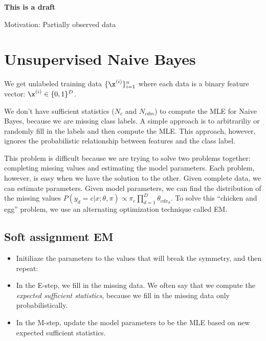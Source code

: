 \documentclass{discussion}
\begin{document}

{\Huge \bf This is a draft}


Motivation: Partially observed data

\section{Unsupervised Naive Bayes}
We get unlabeled training data $\{\x^{(i)}\}_{i=1}^{n}$ where each data is a binary feature vector: $\x^{(i)} \in \{0,1\}^D$.

We don't have sufficient statistics ($N_c$ and $N_{cdm}$) to compute the MLE for Naive Bayes, because we are missing class labels. A simple approach is to arbitrariliy or randomly fill in the labels and then compute the MLE. This approach, however, ignores the probabilistic relationship between features and the class label.

This problem is difficult because we are trying to solve two problems together: completing missing values and estimating the model parameters. Each problem, however, is easy when we have the solution to the other. Given complete data, we can estimate parameters. Given model parameters, we can find the distribution of the missing values $P(y_d = c | x; \theta, \pi) \propto \pi_{c} \prod_{d=1}^{D} \theta_{c d x_d}$. To solve this ``chicken and egg'' problem, we use an alternating optimization technique called EM.

\subsection{Soft assignment EM}

\begin{itemize}
    \item Initiliaze the parameters to the values that will break the symmetry, and then repeat:
    \item In the E-step, we fill in the missing data. We often say that we compute the \emph{expected sufficient statistics}, because we fill in the missing data only probabilistically.
    \item In the M-step, update the model parameters to be the MLE based on new expected sufficient statistics.
\end{itemize}
\end{document}
